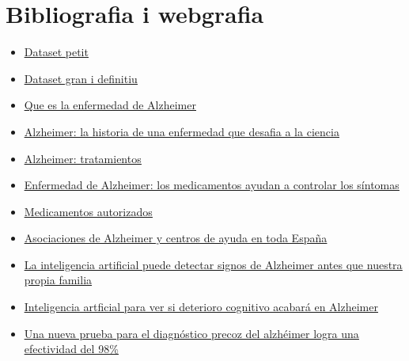 \documentclass[a4paper,12pt]{article}
\begin{document}
\section*{Bibliografia i webgrafia}
\begin{itemize}
\item \href{https://www.kaggle.com/datasets/legendahmed/alzheimermridataset}{\underline{Dataset petit}}
    \item \href{https://www.kaggle.com/datasets/uraninjo/augmented-alzheimer-mri-dataset?resource=download}{\underline{Dataset gran i definitiu}}
    \item \href{https://www.alz.org/alzheimer-demencia/que-es-la-enfermedad-de-alzheimer }{\underline{Que es la enfermedad de Alzheimer}}
    \item \href{https://www.caeme.org.ar/alzheimer-la-historia-de-una-enfermedad-que-desafia-a-la-ciencia/}{\underline{Alzheimer: la historia de una enfermedad que desafia a la ciencia }}
    \item \href{https://www.alz.org/alzheimer-demencia/tratamientos}{\underline{Alzheimer: tratamientos}}
    \item \href{https://www.mayoclinic.org/es-es/diseases-conditions/alzheimers-disease/in-depth/alzheimers/art-20048103}{\underline{Enfermedad de Alzheimer: los medicamentos ayudan a controlar los síntomas}}
    \item \href{http://www.alzfae.org/fundacion/549/medicamentos-autorizados}{\underline{Medicamentos autorizados}}
    \item \href{https://aiudo.es/asociaciones-de-alzheimer-y-centros/#asociaciones-de-alzheimer}{\underline{Asociaciones de Alzheimer y centros de ayuda en toda España}}
    \item \href{https://www.aecoc.es/innovation-hub-noticias/la-inteligencia-artificial-puede-detectar-signos-de-alzheimer-antes-que-nuestra-propia-familia/}{\underline{La inteligencia artificial puede detectar signos de Alzheimer antes que nuestra propia familia}}
    \item \href{https://www.lavanguardia.com/vida/20220427/8225520/inteligencia-artificial-ver-deterioro-cognitivo-acabara-alzheimer.html}{\underline{Inteligencia artficial para ver si deterioro cognitivo acabará en Alzheimer}}
    \item \href{https://www.larazon.es/sociedad/20220620/ajwe2fywxzgnta7zt4godk4bae.html}{\underline{Una nueva prueba para el diagnóstico precoz del alzhéimer logra una efectividad del 98\%}}

\end{itemize}
\end{document}
